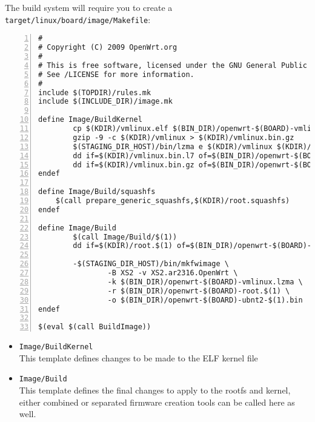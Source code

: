 The build system will require you to create a \texttt{target/linux/board/image/Makefile}:

\begin{Verbatim}[frame=single,numbers=left]
#
# Copyright (C) 2009 OpenWrt.org
#
# This is free software, licensed under the GNU General Public License v2.
# See /LICENSE for more information.
#
include $(TOPDIR)/rules.mk
include $(INCLUDE_DIR)/image.mk

define Image/BuildKernel
        cp $(KDIR)/vmlinux.elf $(BIN_DIR)/openwrt-$(BOARD)-vmlinux.elf
        gzip -9 -c $(KDIR)/vmlinux > $(KDIR)/vmlinux.bin.gz
        $(STAGING_DIR_HOST)/bin/lzma e $(KDIR)/vmlinux $(KDIR)/vmlinux.bin.l7
        dd if=$(KDIR)/vmlinux.bin.l7 of=$(BIN_DIR)/openwrt-$(BOARD)-vmlinux.lzma bs=65536 conv=sync
        dd if=$(KDIR)/vmlinux.bin.gz of=$(BIN_DIR)/openwrt-$(BOARD)-vmlinux.gz bs=65536 conv=sync
endef

define Image/Build/squashfs
    $(call prepare_generic_squashfs,$(KDIR)/root.squashfs)
endef

define Image/Build
        $(call Image/Build/$(1))
        dd if=$(KDIR)/root.$(1) of=$(BIN_DIR)/openwrt-$(BOARD)-root.$(1) bs=128k conv=sync

        -$(STAGING_DIR_HOST)/bin/mkfwimage \
                -B XS2 -v XS2.ar2316.OpenWrt \
                -k $(BIN_DIR)/openwrt-$(BOARD)-vmlinux.lzma \
                -r $(BIN_DIR)/openwrt-$(BOARD)-root.$(1) \
                -o $(BIN_DIR)/openwrt-$(BOARD)-ubnt2-$(1).bin
endef

$(eval $(call BuildImage))

\end{Verbatim}

\begin{itemize}
    \item \texttt{Image/BuildKernel} \\
        This template defines changes to be made to the ELF kernel file
    \item \texttt{Image/Build} \\
	This template defines the final changes to apply to the rootfs and kernel, either combined or separated
	firmware creation tools can be called here as well.
\end{itemize}
